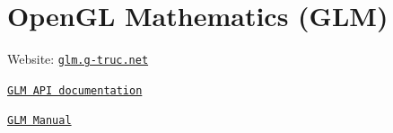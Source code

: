 \chapter{Open\+GL Mathematics (GLM) }
\hypertarget{index}{}\label{index}

\begin{DoxyItemize}
\item Website:\+ \href{https://glm.g-truc.net}{\texttt{glm.\+g-\/truc.\+net}}
\item \href{modules.html}{\texttt{GLM API documentation}}
\item \href{https://github.com/g-truc/glm/blob/master/manual.md}{\texttt{GLM Manual}} 
\end{DoxyItemize}